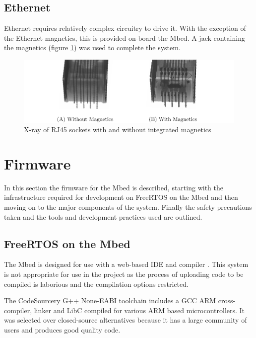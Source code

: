 		\subsection{Ethernet}
			
			Ethernet requires relatively complex circuitry to drive it. With the
			exception of the Ethernet magnetics, this is provided on-board the Mbed. A
			jack containing the magnetics (figure \ref{fig:jackMagnetics}) was used to
			complete the system.
			
			\begin{figure}
				\includegraphics[width=1\textwidth]{diagrams/jackMagnetics.pdf}
				\caption{X-ray of RJ45 sockets with and without integrated magnetics
				         \cite{raspimag}}
				\label{fig:jackMagnetics}
			\end{figure}
	
	\section{Firmware}
		
		In this section the firmware for the Mbed is described, starting with the
		infrastructure required for development on FreeRTOS on the Mbed and then
		moving on to the major components of the system. Finally the safety
		precautions taken and the tools and development practices used are outlined.
		
		\subsection{FreeRTOS on the Mbed}
			
			\label{sec:compiler}
			
			The Mbed is designed for use with a web-based IDE and compiler
			\cite{mbedcompiler}. This system is not appropriate for use in the project
			as the process of uploading code to be compiled is laborious and the
			compilation options restricted.
			
			The CodeSourcery G++ None-EABI toolchain includes a GCC ARM
			cross-compiler, linker and LibC compiled for various ARM based
			microcontrollers. It was selected over closed-source alternatives because
			it has a large community of users and produces good quality code.
			
